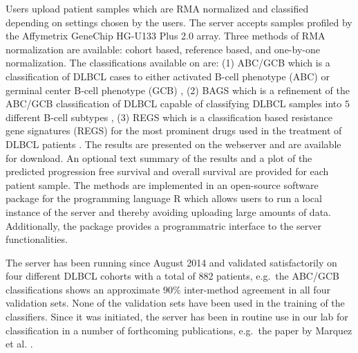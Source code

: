 Users upload patient samples which are RMA normalized and classified depending on settings chosen by the users. 
The server accepts samples profiled by the Affymetrix GeneChip HG-U133 Plus 2.0 array. 
Three methods of RMA normalization are available: cohort based, reference based, and one-by-one normalization. 
The classifications available on \hemaClass{} are:
(1) ABC/GCB which is a classification of DLBCL cases to either activated B-cell phenotype (ABC) or germinal center B-cell phenotype (GCB) \cite{Alizadeh2000},
(2) BAGS which is a refinement of the ABC/GCB classification of DLBCL capable of classifying DLBCL samples into $5$ different B-cell subtypes \cite{DybkaerBoegsted2015},
(3) REGS which is a classification based resistance gene signatures (REGS) for the most prominent drugs used in the treatment of DLBCL patients \cite{Falgreen2015}.
The results are presented on the webserver and are available for download. 
An optional text summary of the results and a plot of the predicted progression free survival and overall survival are provided for each patient sample.
The methods are implemented in an open-source software package for the programming language \textsf{R} which allows users to run a local instance of the server and thereby avoiding uploading large amounts of data. 
Additionally, the package provides a programmatric interface to the server functionalities. 

The server has been running since August 2014 and validated satisfactorily on four different DLBCL cohorts with a total of 882 patients, e.g.\ the ABC/GCB classifications shows an approximate $90 \%$ inter-method agreement in all four validation sets. 
None of the validation sets have been used in the training of the classifiers. 
Since it was initiated, the server has been in routine use in our lab for classification in a number of forthcoming publications, e.g.\ the paper by Marquez et al. \cite{Marquez2015}.

\begingroup
\renewcommand{\section}[2]{}%


\endgroup



